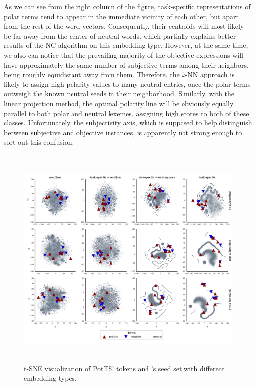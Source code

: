As we can see from the right column of the figure, task-specific
representations of polar terms tend to appear in the immediate
vicinity of each other, but apart from the rest of the word vectors.
Consequently, their centroids will most likely be far away from the
center of neutral words, which partially explains better results of
the NC algorithm on this embedding type.  However, at the same time,
we also can notice that the prevailing majority of the objective
expressions will have approximately the same number of subjective
terms among their neighbors, being roughly equidistant away from them.
Therefore, the $k$-NN approach is likely to assign high polarity
values to many neutral entries, once the polar terms outweigh the
known neutral seeds in their neighborhood.  Similarly, with the linear
projection method, the optimal polarity line will be obviously equally
parallel to both polar and neutral lexemes, assigning high scores to
both of these classes.  Unfortunately, the subjectivity axis, which is
supposed to help distinguish between subjective and objective
instances, is apparently not strong enough to sort out this confusion.

\begin{figure}[bht]
  \centering
  \includegraphics[height=30em,width=\linewidth]{img/potts_embeddings.png}
  \caption[Visualization of \citeauthor{Turney:03}'s seed set]{t-SNE
    visualization of PotTS' tokens and \citeauthor{Turney:03}'s seed
    set with different embedding types.}\label{snt:fig:tsne-seeds}
\end{figure}

